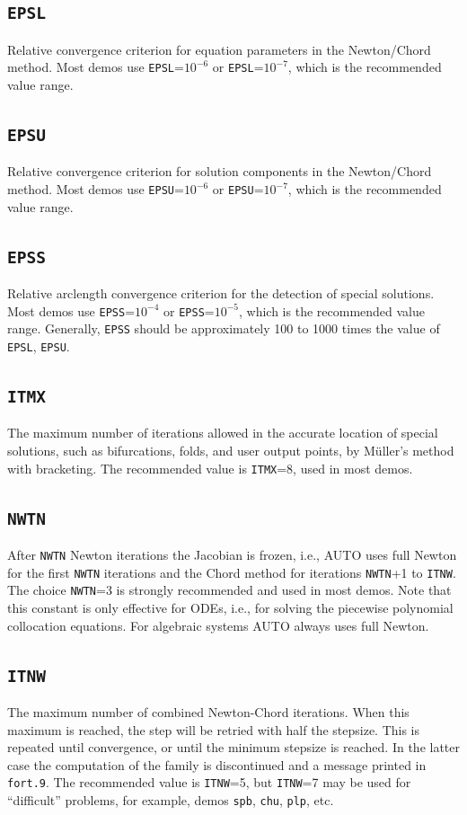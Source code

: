 \documentclass[12pt]{report}
\begin{document}
\subsection{\texttt{EPSL}}  \label{sec:EPSL}
 Relative convergence criterion for equation parameters in the Newton/Chord 
 method. Most demos use {\tt EPSL}=$10^{-6}$ or {\tt EPSL}=$10^{-7}$,
 which is the recommended value range.

\subsection{\texttt{EPSU}}  \label{sec:EPSU}
 Relative convergence criterion for solution components in the Newton/Chord 
 method. Most demos use {\tt EPSU}=$10^{-6}$ or {\tt EPSU}=$10^{-7}$,
 which is the recommended value range.

\subsection{\texttt{EPSS}}  \label{sec:EPSS}
 Relative arclength convergence criterion for the detection of special solutions. 
 Most demos use {\tt EPSS}=$10^{-4}$ or  {\tt EPSS}=$10^{-5}$,
 which is the recommended value range.
 Generally, {\tt EPSS} should be approximately 100 to 1000 times the value
 of {\tt EPSL}, {\tt EPSU}.
 
\subsection{\texttt{ITMX}}  \label{sec:ITMX}
 The maximum number of iterations allowed in the accurate
 location of special solutions, such as bifurcations, folds, 
 and user output points, by M\"uller's method with bracketing.
 The recommended value is {\tt ITMX}=8, used in most demos.

\subsection{\texttt{NWTN}}  \label{sec:NWTN}
 After {\tt NWTN} Newton iterations the Jacobian is frozen, i.e.,
 {\cal AUTO} uses full Newton for the first {\tt NWTN} iterations
 and the Chord method for iterations {\tt NWTN}+1 to {\tt ITNW}.
 The choice {\tt NWTN}=3 is strongly recommended and used in most demos.
 Note that this constant is only effective for ODEs, i.e., for solving
 the piecewise polynomial collocation equations.
 For algebraic systems {\cal AUTO} always uses full Newton.

\subsection{\texttt{ITNW}}  \label{sec:ITNW}
 The maximum number of combined Newton-Chord iterations.
 When this maximum is reached, the step will be retried with 
 half the stepsize.
 This is repeated until convergence, or until the minimum
 stepsize is reached. In the latter case the computation of
 the family is discontinued and a message printed in {\tt fort.9}.
 The recommended value is {\tt ITNW}=5, but {\tt ITNW}=7 may be used for 
 ``difficult'' problems, for example, 
 demos {\tt spb}, {\tt chu}, {\tt plp}, etc.
\end{document}
